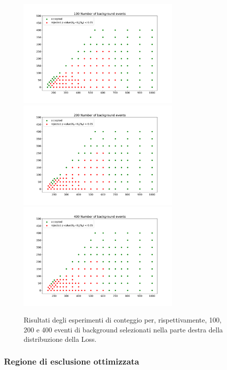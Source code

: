 \begin{figure}[h!]
	\centering
	\includegraphics[width=0.71\textwidth]{figs/risultati_simulazione/100.pdf}
	\includegraphics[width=0.71\textwidth]{figs/risultati_simulazione/200.pdf}
	\includegraphics[width=0.71\textwidth]{figs/risultati_simulazione/400.pdf}
	\caption{Risultati degli esperimenti di conteggio per, rispettivamente, 100, 200 e 400 eventi di background selezionati nella parte destra della distribuzione della Loss.}
	\label{test-100-200-400}
\end{figure}

\subsubsection{Regione di esclusione ottimizzata}
\label{regione di esclusione}


